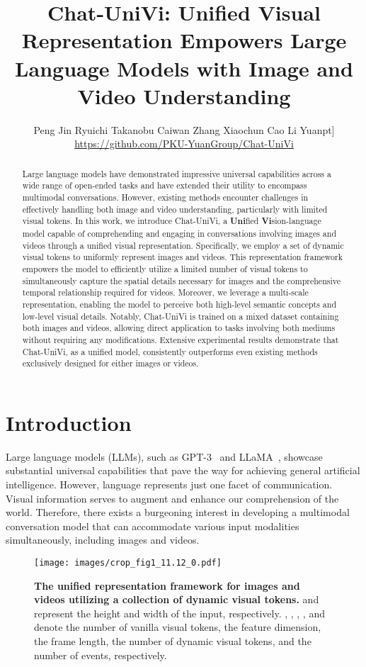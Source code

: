 \documentclass[10pt,twocolumn,letterpaper]{article}
\title{Chat-UniVi: Unified Visual Representation Empowers Large Language Models with Image and Video Understanding}
\author{Peng Jin \quad
    Ryuichi Takanobu \quad
    Caiwan Zhang \quad
    Xiaochun Cao \quad
    Li Yuan\5pt]
    \href{https://github.com/PKU-YuanGroup/Chat-UniVi}{https://github.com/PKU-YuanGroup/Chat-UniVi}
    }
\begin{document}
\maketitle

\begin{abstract}
Large language models have demonstrated impressive universal capabilities across a wide range of open-ended tasks and have extended their utility to encompass multimodal conversations. However, existing methods encounter challenges in effectively handling both image and video understanding, particularly with limited visual tokens. In this work, we introduce Chat-UniVi, a \textbf{Uni}fied \textbf{Vi}sion-language model capable of comprehending and engaging in conversations involving images and videos through a unified visual representation. Specifically, we employ a set of dynamic visual tokens to uniformly represent images and videos. This representation framework empowers the model to efficiently utilize a limited number of visual tokens to simultaneously capture the spatial details necessary for images and the comprehensive temporal relationship required for videos. Moreover, we leverage a multi-scale representation, enabling the model to perceive both high-level semantic concepts and low-level visual details. Notably, Chat-UniVi is trained on a mixed dataset containing both images and videos, allowing direct application to tasks involving both mediums without requiring any modifications. Extensive experimental results demonstrate that Chat-UniVi, as a unified model, consistently outperforms even existing methods exclusively designed for either images or videos.
\end{abstract}

\section{Introduction}
Large language models (LLMs), such as GPT-3~\cite{brown2020language} and LLaMA~\cite{touvron2023llama,touvron2023llama2}, showcase substantial universal capabilities that pave the way for achieving general artificial intelligence. However, language represents just one facet of communication. Visual information serves to augment and enhance our comprehension of the world. Therefore, there exists a burgeoning interest in developing a multimodal conversation model that can accommodate various input modalities simultaneously, including images and videos. 

\begin{figure}[tbp]
\centering
\texttt{[image: images/crop\_fig1\_11.12\_0.pdf]}
\vspace{-1.6em}
\caption{\textbf{The unified representation framework for images and videos utilizing a collection of dynamic visual tokens.}  and  represent the height and width of the input, respectively. , , , , and  denote the number of vanilla visual tokens, the feature dimension, the frame length, the number of dynamic visual tokens, and the number of events, respectively.}
\vspace{-.8em}
\label{fig1}
\end{figure}
\end{document}
